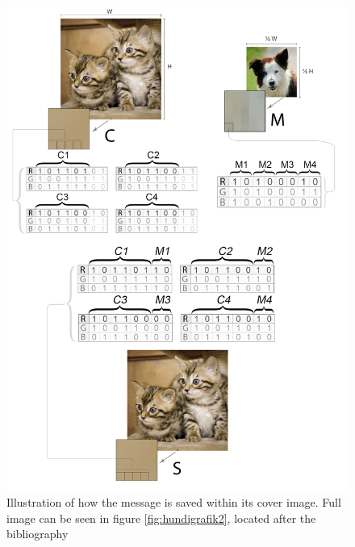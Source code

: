 \begin{figure}
	\centering
	\includegraphics[width=1\textwidth]{figures/hundikatgrafik.png}
	\caption{Illustration of how the message is saved within its cover image. Full image can be seen in figure \ref{fig:hundigrafik2}, located after the bibliography}
	\label{fig:hundigrafik}
\end{figure}



